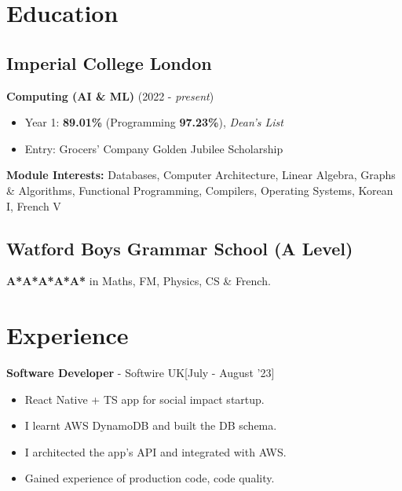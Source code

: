\documentclass{Resume}
\begin{document}

	\section{Education}
		\subsection{Imperial College London}
	\textbf{Computing (AI \& ML)} \hfill (2022 - \textit{present})
 \begin{itemize}
     \item Year 1: \textbf{89.01\%} (Programming \textbf{97.23\%}), \textit{Dean's List}
     \item Entry: Grocers' Company Golden Jubilee Scholarship
 \end{itemize}
\textbf{Module Interests:} Databases, Computer Architecture, Linear Algebra, Graphs \& Algorithms, Functional Programming, Compilers, Operating Systems, Korean I, French V
    
		\subsection{Watford Boys Grammar School (A Level)}
		    \textbf{A*A*A*A*A*} in Maths, FM, Physics, CS \& French.

        \section{Experience}
            \textbf{Software Developer} - Softwire UK\hfill [July - August '23]
            \begin{itemize}
                \item React Native + TS app for social impact startup.
                \item I learnt AWS DynamoDB and built the DB schema.
                \item I architected the app's API and integrated with AWS. 
                \item Gained experience of production code,  code quality.
            \end{itemize}
\end{document}
